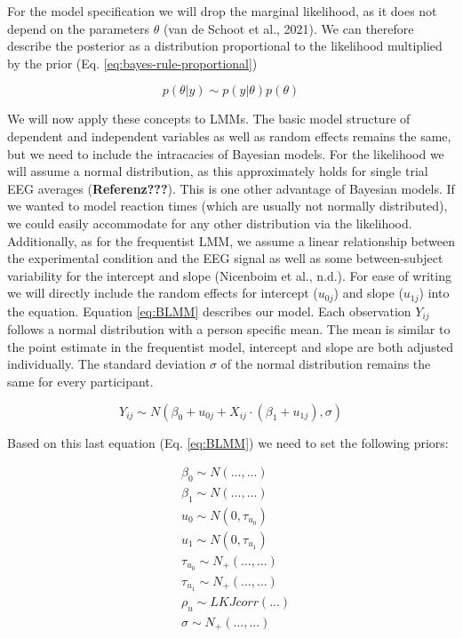 \documentclass[
  doc,12pt,floatsintext]{apa7}
\begin{document}
For the model specification we will drop the marginal likelihood, as it does not depend on the parameters \(\theta\) (van de Schoot et al., 2021). We can therefore describe the posterior as a distribution proportional to the likelihood multiplied by the prior (Eq. \eqref{eq:bayes-rule-proportional})

\begin{equation}
p(\theta|y) \sim p(y|\theta)p(\theta)
\label{eq:bayes-rule-proportional}
\end{equation}

We will now apply these concepts to LMMs. The basic model structure of dependent and independent variables as well as random effects remains the same, but we need to include the intracacies of Bayesian models. For the likelihood we will assume a normal distribution, as this approximately holds for single trial EEG averages (\textbf{Referenz???}). This is one other advantage of Bayesian models. If we wanted to model reaction times (which are usually not normally distributed), we could easily accommodate for any other distribution via the likelihood. Additionally, as for the frequentist LMM, we assume a linear relationship between the experimental condition and the EEG signal as well as some between-subject variability for the intercept and slope (Nicenboim et al., n.d.). For ease of writing we will directly include the random effects for intercept (\(u_{0j}\)) and slope (\(u_{1j}\)) into the equation. Equation \eqref{eq:BLMM} describes our model. Each observation \(Y_{ij}\) follows a normal distribution with a person specific mean. The mean is similar to the point estimate in the frequentist model, intercept and slope are both adjusted individually. The standard deviation \(\sigma\) of the normal distribution remains the same for every participant.

\begin{equation}
Y_{ij} \sim N(\beta_{0} + u_{0j} + X_{ij} \cdot (\beta_{1} + u_{1j}), \sigma)
\label{eq:BLMM}
\end{equation}

Based on this last equation (Eq. \eqref{eq:BLMM}) we need to set the following priors:

\begin{equation}
\begin{split}
& \beta_{0} \sim N(...,...) \\
& \beta_{1} \sim N(...,...) \\
& u_0 \sim N(0,\tau_{u_0}) \\
& u_1 \sim N(0,\tau_{u_1}) \\
& \tau_{u_0} \sim N_+(...,...) \\
& \tau_{u_1} \sim N_+(...,...) \\
& \rho_u \sim LKJcorr(...) \\
& \sigma \sim N_+(...,...)
\end{split}
\label{eq:priors-BLMM}
\end{equation}
\end{document}
